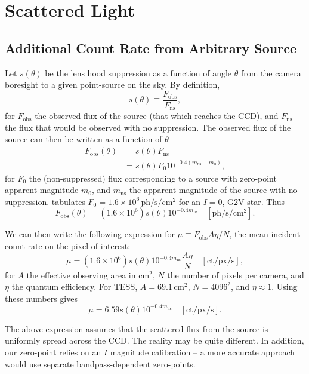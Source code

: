 \section{Scattered Light}
\subsection{Additional Count Rate from Arbitrary Source}
Let $s(\theta)$ be the lens hood suppression as a function of angle $\theta$ 
from the camera boresight to a given point-source on the sky. By definition,
\begin{equation}
s(\theta) \equiv \frac{F_\mathrm{obs}}{F_\mathrm{ns}},
\end{equation}
for $F_\mathrm{obs}$ the observed flux of the source (that which reaches the 
CCD), and $F_\mathrm{ns}$ the flux that would be observed with no 
suppression.
The observed flux of the source can then be written as a function of $\theta$
\begin{align}
	F_\mathrm{obs}(\theta) &= s(\theta) F_\mathrm{ns}  \\
	&= s(\theta) F_0 10^{-0.4(m_\mathrm{ns} - m_0)} ,
\end{align}
for $F_0$ the (non-suppressed) flux corresponding to a source with zero-point 
apparent magnitude $m_0$, and $m_\mathrm{ns}$ the apparent magnitude of 
the source with no suppression.
\citet{winn_searchable_2013} tabulates $F_0 = 
1.6\times10^6\,\mathrm{ph/s/cm^2}$ 
for an $I=0$, G2V star.
Thus
\begin{equation}
F_\mathrm{obs}(\theta) = (1.6\times 10^6) s(\theta) 10^{-0.4 m_\mathrm{ns}} 
\quad \mathrm{[ph/s/cm^2]}.
\end{equation}

We can then write the following expression for $\mu\equiv F_\mathrm{obs} A \eta 
/ N$, the mean incident count rate on the pixel of interest:
\begin{equation}
\mu =  (1.6\times 10^6) s(\theta) 10^{-0.4 m_\mathrm{ns}} \frac{A 
\eta}{N} \quad \mathrm{[ct/px/s]},
\end{equation}
for $A$ the effective observing area in $\mathrm{cm^2}$, $N$ the 
number of pixels per camera, and $\eta$ the quantum efficiency.
For TESS, $A=69.1\,\mathrm{cm^2}$, $N=4096^2$, and $\eta\approx 1$. Using
these numbers gives
\begin{equation}
\mu = 6.59  s(\theta) 10^{-0.4 m_\mathrm{ns}}\quad 
\mathrm{[ct/px/s]}.
\label{eq:mean_added_flux}
\end{equation}

The above expression assumes that the scattered flux from the source 
is uniformly spread across the CCD. The reality may be quite different.
In addition, our zero-point relies on an $I$ magnitude calibration -- 
a more accurate approach would use separate bandpass-dependent zero-points.

